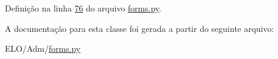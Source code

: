 Definição na linha \hyperlink{Adm_2forms_8py_source_l00076}{76} do arquivo \hyperlink{Adm_2forms_8py_source}{forms.\-py}.



A documentação para esta classe foi gerada a partir do seguinte arquivo\-:\begin{DoxyCompactItemize}
\item 
E\-L\-O/\-Adm/\hyperlink{Adm_2forms_8py}{forms.\-py}\end{DoxyCompactItemize}
